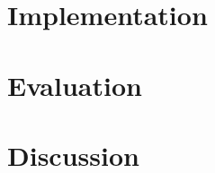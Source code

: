 \documentclass[11pt]{article}
\begin{document}
\section{Implementation}


\section{Evaluation}

\section{Discussion}
\end{document}
